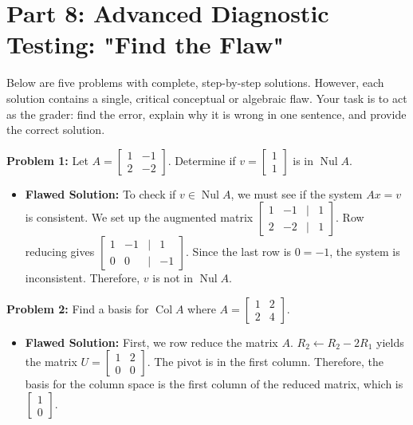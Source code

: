 \documentclass[11pt]{article}
\begin{document}
\newpage

\section{Part 8: Advanced Diagnostic Testing: "Find the Flaw"}

Below are five problems with complete, step-by-step solutions. However, each solution contains a single, critical conceptual or algebraic flaw. Your task is to act as the grader: find the error, explain why it is wrong in one sentence, and provide the correct solution.

\vspace{0.5cm}
\textbf{Problem 1:} Let $A = \begin{bmatrix} 1 & -1 \\ 2 & -2 \end{bmatrix}$. Determine if $v = \begin{bmatrix} 1 \\ 1 \end{bmatrix}$ is in $\operatorname{Nul} A$.
\begin{itemize}
    \item \textbf{Flawed Solution:} To check if $v \in \operatorname{Nul} A$, we must see if the system $Ax = v$ is consistent. We set up the augmented matrix $\begin{bmatrix} 1 & -1 & \big| & 1 \\ 2 & -2 & \big| & 1 \end{bmatrix}$. Row reducing gives $\begin{bmatrix} 1 & -1 & \big| & 1 \\ 0 & 0 & \big| & -1 \end{bmatrix}$. Since the last row is $0 = -1$, the system is inconsistent. Therefore, $v$ is not in $\operatorname{Nul} A$.
\end{itemize}

\vspace{0.5cm}
\textbf{Problem 2:} Find a basis for $\operatorname{Col} A$ where $A = \begin{bmatrix} 1 & 2 \\ 2 & 4 \end{bmatrix}$.
\begin{itemize}
    \item \textbf{Flawed Solution:} First, we row reduce the matrix $A$. $R_2 \leftarrow R_2 - 2R_1$ yields the matrix $U = \begin{bmatrix} 1 & 2 \\ 0 & 0 \end{bmatrix}$. The pivot is in the first column. Therefore, the basis for the column space is the first column of the reduced matrix, which is $\begin{bmatrix} 1 \\ 0 \end{bmatrix}$.
\end{itemize}
\end{document}
